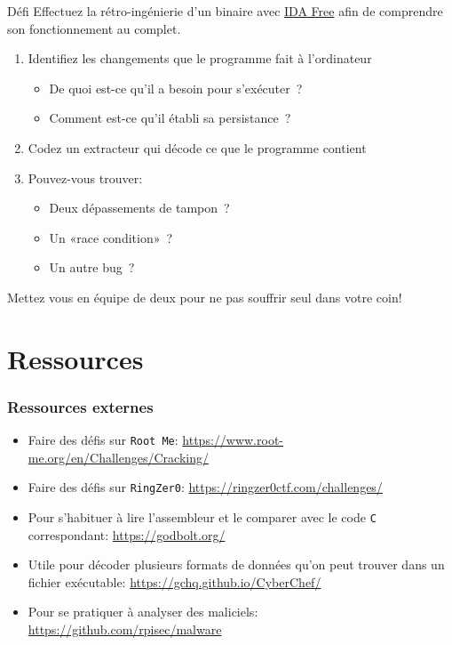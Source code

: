 \documentclass[10pt,xcolor={table,dvipsnames},t]{beamer}
\begin{document}
\begin{frame}{Défi}
    Effectuez la rétro-ingénierie d'un binaire avec \href{https://www.hex-rays.com/products/ida/support/download_freeware.shtml}{IDA Free} afin de comprendre son fonctionnement au complet.
    \begin{enumerate}
        \item Identifiez les changements que le programme fait à l'ordinateur
        \begin{itemize}
            \item De quoi est-ce qu'il a besoin pour s'exécuter ?
            \item Comment est-ce qu'il établi sa persistance ?
        \end{itemize}
        \item Codez un extracteur qui décode ce que le programme contient
        \item Pouvez-vous trouver: 
        \begin{itemize}
            \item Deux dépassements de tampon ?
            \item Un «race condition» ?
            \item Un autre bug ?
        \end{itemize}
    \end{enumerate}
    Mettez vous en équipe de deux pour ne pas souffrir seul dans votre coin!
\end{frame}


\section{Ressources}

\begin{frame}
    \frametitle{Ressources externes}
    \begin{itemize}
        \item Faire des défis sur \texttt{Root Me}: \url{https://www.root-me.org/en/Challenges/Cracking/}
        \item Faire des défis sur \texttt{RingZer0}: \url{https://ringzer0ctf.com/challenges/}
        \item Pour s'habituer à lire l'assembleur et le comparer avec le code \texttt{C} correspondant: \url{https://godbolt.org/}
        \item Utile pour décoder plusieurs formats de données qu'on peut trouver dans un fichier exécutable: \url{https://gchq.github.io/CyberChef/}
        \item Pour se pratiquer à analyser des maliciels: \url{https://github.com/rpisec/malware}
    \end{itemize}
\end{frame}
\end{document}
